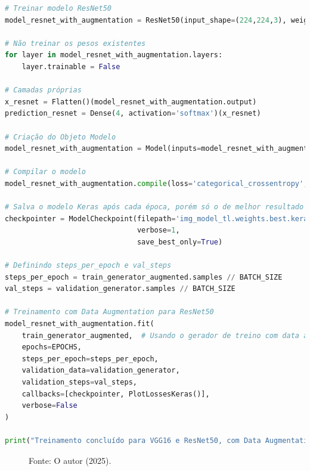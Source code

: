 \begin{lstlisting}[language=Python, style=input]
# Treinar modelo ResNet50
model_resnet_with_augmentation = ResNet50(input_shape=(224,224,3), weights='imagenet', include_top=False)

# Não treinar os pesos existentes
for layer in model_resnet_with_augmentation.layers:
    layer.trainable = False

# Camadas próprias
x_resnet = Flatten()(model_resnet_with_augmentation.output)
prediction_resnet = Dense(4, activation='softmax')(x_resnet)

# Criação do Objeto Modelo
model_resnet_with_augmentation = Model(inputs=model_resnet_with_augmentation.input, outputs=prediction_resnet)

# Compilar o modelo
model_resnet_with_augmentation.compile(loss='categorical_crossentropy', optimizer=RMSprop(learning_rate=0.0001), metrics=['accuracy'])

# Salva o modelo Keras após cada época, porém só o de melhor resultado
checkpointer = ModelCheckpoint(filepath='img_model_tl.weights.best.keras',
                               verbose=1,
                               save_best_only=True)

# Definindo steps_per_epoch e val_steps
steps_per_epoch = train_generator_augmented.samples // BATCH_SIZE
val_steps = validation_generator.samples // BATCH_SIZE

# Treinamento com Data Augmentation para ResNet50
model_resnet_with_augmentation.fit(
    train_generator_augmented,  # Usando o gerador de treino com data augmentation
    epochs=EPOCHS,
    steps_per_epoch=steps_per_epoch,
    validation_data=validation_generator,
    validation_steps=val_steps,
    callbacks=[checkpointer, PlotLossesKeras()],
    verbose=False
)

print("Treinamento concluído para VGG16 e ResNet50, com Data Augmentation.")
\end{lstlisting}
\begin{figure}[h!]
\centering
\caption{Acurácia e perda ResNet50 com data augmentation}
\hspace*{-2cm} %
\caption*{Fonte: O autor (2025).}
\end{figure}

